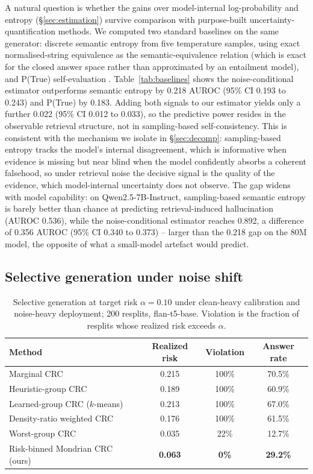 \documentclass[sn-basic]{sn-jnl}
\theoremstyle{thmstyleone}
\theoremstyle{thmstyletwo}
\begin{document}
A natural question is whether the gains over model-internal log-probability
and entropy (\S\ref{sec:estimation}) survive comparison with purpose-built
uncertainty-quantification methods. We computed two standard baselines on
the same generator: discrete semantic entropy
\citep{kuhn2023semantic,farquhar2024nature} from five temperature samples,
using exact normalised-string equivalence as the semantic-equivalence
relation (which is exact for the closed answer space rather than approximated
by an entailment model), and P(True) self-evaluation
\citep{kadavath2022language}. Table~\ref{tab:baselines} shows the noise-conditional
estimator outperforms semantic entropy by 0.218 AUROC
(95\% CI 0.193 to 0.243) and P(True) by 0.183. Adding both signals to our
estimator yields only a further 0.022 (95\% CI 0.012 to 0.033), so the
predictive power resides in the observable retrieval structure, not in
sampling-based self-consistency. This is consistent with the
mechanism we isolate in \S\ref{sec:decomp}: sampling-based entropy tracks the
model's internal disagreement, which is informative when evidence is missing
but near blind when the model confidently absorbs a coherent falsehood, so under
retrieval noise the decisive signal is the quality of the evidence, which
model-internal uncertainty does not observe. The gap widens with model capability: on Qwen2.5-7B-Instruct, sampling-based
semantic entropy is barely better than chance at predicting
retrieval-induced hallucination (AUROC 0.536), while the noise-conditional
estimator reaches 0.892, a difference of 0.356 AUROC (95\% CI 0.340 to
0.373) -- larger than the 0.218 gap on the 80M model, the opposite of what a
small-model artefact would predict.

\subsection{Selective generation under noise shift}\label{sec:conformal}

\begin{table}[tbp]
\centering\small
\caption{Selective generation at target risk $\alpha = 0.10$ under
clean-heavy calibration and noise-heavy deployment; 200 resplits,
flan-t5-base. Violation is the fraction of resplits whose realized risk
exceeds $\alpha$.}
\label{tab:crc}
\begin{tabular}{lccc}
\toprule
Method & Realized risk & Violation & Answer rate \\
\midrule
Marginal CRC                    & 0.215 & 100\% & 70.5\% \\
Heuristic-group CRC             & 0.189 & 100\% & 60.9\% \\
Learned-group CRC ($k$-means)   & 0.213 & 100\% & 67.0\% \\
Density-ratio weighted CRC      & 0.176 & 100\% & 61.5\% \\
Worst-group CRC                 & 0.035 & 22\%  & 12.7\% \\
Risk-binned Mondrian CRC (ours) & \textbf{0.063} & \textbf{0\%} & \textbf{29.2\%} \\
\bottomrule
\end{tabular}
\end{table}
\end{document}
